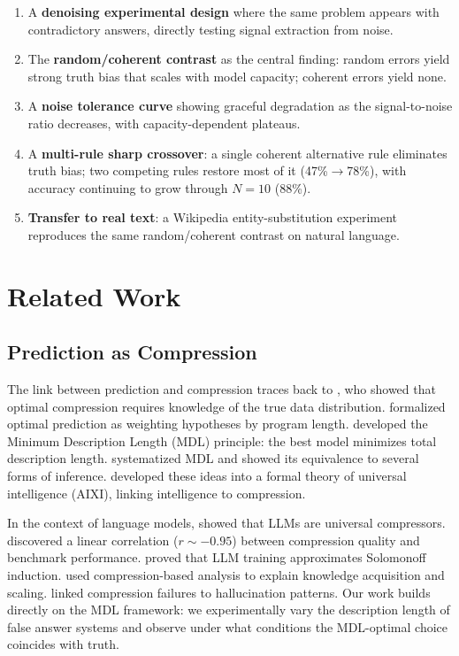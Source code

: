 \documentclass[10pt]{article} %
\begin{document}
\begin{enumerate}
    \item A \textbf{denoising experimental design} where the same problem appears with contradictory answers, directly testing signal extraction from noise.
    \item The \textbf{random/coherent contrast} as the central finding: random errors yield strong truth bias that scales with model capacity; coherent errors yield none.
    \item A \textbf{noise tolerance curve} showing graceful degradation as the signal-to-noise ratio decreases, with capacity-dependent plateaus.
    \item A \textbf{multi-rule sharp crossover}: a single coherent alternative rule eliminates truth bias; two competing rules restore most of it (47\%$\to$78\%), with accuracy continuing to grow through $N{=}10$ (88\%).
    \item \textbf{Transfer to real text}: a Wikipedia entity-substitution experiment reproduces the same random/coherent contrast on natural language.
\end{enumerate}

\section{Related Work}
\label{sec:related}

\subsection{Prediction as Compression}

The link between prediction and compression traces back to \citet{shannon1948mathematical}, who showed that optimal compression requires knowledge of the true data distribution. \citet{solomonoff1964formal} formalized optimal prediction as weighting hypotheses by program length. \citet{rissanen1978modeling} developed the Minimum Description Length (MDL) principle: the best model minimizes total description length. \citet{grunwald2007minimum} systematized MDL and showed its equivalence to several forms of inference. \citet{hutter2005universal} developed these ideas into a formal theory of universal intelligence (AIXI), linking intelligence to compression.

In the context of language models, \citet{deletang2024language} showed that LLMs are universal compressors. \citet{huang2024compression} discovered a linear correlation ($r \sim -0.95$) between compression quality and benchmark performance. \citet{wan2025large} proved that LLM training approximates Solomonoff induction. \citet{pan2025understanding} used compression-based analysis to explain knowledge acquisition and scaling. \citet{chlon2025predictable} linked compression failures to hallucination patterns. Our work builds directly on the MDL framework: we experimentally vary the description length of false answer systems and observe under what conditions the MDL-optimal choice coincides with truth.
\end{document}
